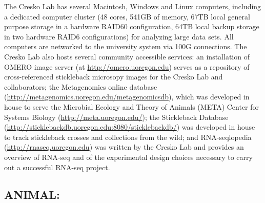 \documentclass[
]{book}
\begin{document}
The Cresko Lab has several Macintosh, Windows and Linux computers, including a dedicated computer cluster (48 cores, 541GB of memory, 67TB local general purpose storage in a hardware RAID60 configuration, 64TB local backup storage in two hardware RAID6 configurations) for analyzing large data sets. All computers are networked to the university system via 100G connections. The Cresko Lab also hosts several community accessible services: an installation of OMERO image server (at \url{http://omero.uoregon.edu}) serves as a repository of cross-referenced stickleback microsopy images for the Cresko Lab and collaborators; the Metagenomics online database (\url{http://metagenomics.uoregon.edu/metagenomicsdb}), which was developed in house to serve the Microbial Ecology and Theory of Animals (META) Center for Systems Biology (\url{http://meta.uoregon.edu/}); the Stickleback Database (\url{http://sticklebackdb.uoregon.edu:8080/sticklebackdb/}) was developed in house to track stickleback crosses and collections from the wild; and RNA-seqlopedia (\url{http://rnaseq.uoregon.edu}) was written by the Cresko Lab and provides an overview of RNA-seq and of the experimental design choices necessary to carry out a successful RNA-seq project.

\hypertarget{animal}{%
\subsection{ANIMAL:}\label{animal}}
\end{document}
